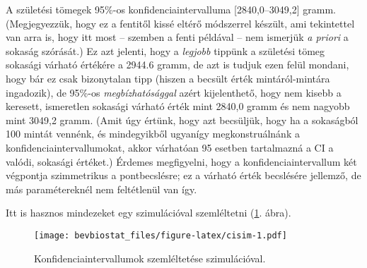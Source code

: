 \documentclass[
]{book}
\newenvironment{Shaded}{\begin{snugshade}}{\end{snugshade}}
\newcommand{\DataTypeTok}[1]{\textcolor[rgb]{0.13,0.29,0.53}{#1}}
\newcommand{\DecValTok}[1]{\textcolor[rgb]{0.00,0.00,0.81}{#1}}
\newcommand{\FloatTok}[1]{\textcolor[rgb]{0.00,0.00,0.81}{#1}}
\newcommand{\KeywordTok}[1]{\textcolor[rgb]{0.13,0.29,0.53}{\textbf{#1}}}
\newcommand{\NormalTok}[1]{#1}
\newcommand{\OperatorTok}[1]{\textcolor[rgb]{0.81,0.36,0.00}{\textbf{#1}}}
\newcommand{\OtherTok}[1]{\textcolor[rgb]{0.56,0.35,0.01}{#1}}
\newcommand{\StringTok}[1]{\textcolor[rgb]{0.31,0.60,0.02}{#1}}
\begin{document}
A születési tömegek 95\%-os konfidenciaintervalluma {[}2840,0--3049,2{]} gramm. (Megjegyezzük, hogy ez a fentitől kissé eltérő módszerrel készült, ami tekintettel van arra is, hogy itt most -- szemben a fenti példával -- nem ismerjük \emph{a priori} a sokaság szórását.) Ez azt jelenti, hogy a \emph{legjobb} tippünk a születési tömeg sokasági várható értékére a 2944.6 gramm, de azt is tudjuk ezen felül mondani, hogy bár ez csak bizonytalan tipp (hiszen a becsült érték mintáról-mintára ingadozik), de 95\%-os \emph{megbízhatósággal} azért kijelenthető, hogy nem kisebb a keresett, ismeretlen sokasági várható érték mint 2840,0 gramm és nem nagyobb mint 3049,2 gramm. (Amit úgy értünk, hogy azt becsüljük, hogy ha a sokaságból 100 mintát vennénk, és mindegyikből ugyanígy megkonstruálnánk a konfidenciaintervallumokat, akkor várhatóan 95 esetben tartalmazná a CI a valódi, sokasági értéket.) Érdemes megfigyelni, hogy a konfidenciaintervallum két végpontja szimmetrikus a pontbecslésre; ez a várható érték becslésére jellemző, de más paramétereknél nem feltétlenül van így.

Itt is hasznos mindezeket egy szimulációval szemléltetni (\ref{fig:cisim}. ábra).

\begin{Shaded}
\end{Shaded}

\begin{figure}
\centering
\texttt{[image: bevbiostat\_files/figure-latex/cisim-1.pdf]}
\caption{\label{fig:cisim}Konfidenciaintervallumok szemléltetése szimulációval.}
\end{figure}
\end{document}
